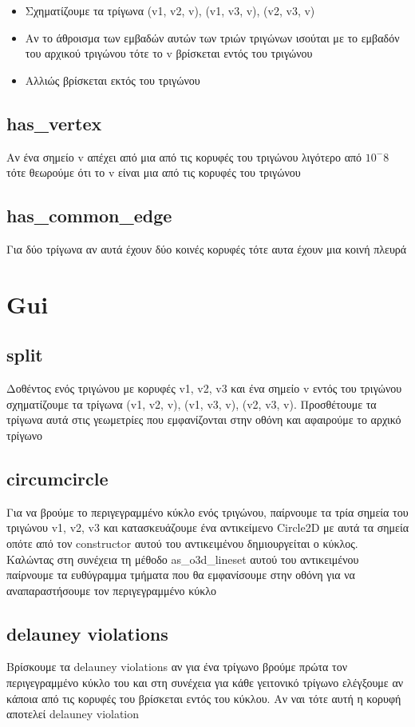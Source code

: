 \documentclass{article}
\begin{document}
\begin{itemize}
	\item Σχηματίζουμε τα τρίγωνα (v1, v2, v), (v1, v3, v), (v2, v3, v)
	\item Αν το άθροισμα των εμβαδών αυτών των τριών τριγώνων ισούται με το εμβαδόν του αρχικού τριγώνου τότε το v βρίσκεται εντός του τριγώνου
	\item Αλλιώς βρίσκεται εκτός του τριγώνου
\end{itemize}

\subsection{has\_vertex}
Αν ένα σημείο v απέχει από μια από τις κορυφές του τριγώνου λιγότερο από $10^-8$
τότε θεωρούμε ότι το v είναι μια από τις κορυφές του τριγώνου

\subsection{has\_common\_edge}
Για δύο τρίγωνα αν αυτά έχουν δύο κοινές κορυφές τότε αυτα έχουν μια κοινή πλευρά

\section{Gui}
\subsection{split}
Δοθέντος ενός τριγώνου με κορυφές v1, v2, v3 και ένα σημείο v εντός του τριγώνου
σχηματίζουμε τα τρίγωνα (v1, v2, v), (v1, v3, v), (v2, v3, v). Προσθέτουμε τα τρίγωνα
αυτά στις γεωμετρίες που εμφανίζονται στην οθόνη και αφαιρούμε το αρχικό τρίγωνο

\subsection{circumcircle}
Για να βρούμε το περιγεγραμμένο κύκλο ενός τριγώνου, παίρνουμε τα τρία σημεία του τριγώνου v1, v2, v3 και κατασκευάζουμε ένα αντικείμενο Circle2D με αυτά τα σημεία οπότε από
τον constructor αυτού του αντικειμένου δημιουργείται ο κύκλος. Καλώντας στη συνέχεια τη
μέθοδο as\_o3d\_lineset αυτού του αντικειμένου παίρνουμε τα ευθύγραμμα τμήματα που θα
εμφανίσουμε στην οθόνη για να αναπαραστήσουμε τον περιγεγραμμένο κύκλο

\subsection{delauney violations}
Βρίσκουμε τα delauney violations αν για ένα τρίγωνο βρούμε πρώτα τον περιγεγραμμένο
κύκλο του και στη συνέχεια για κάθε γειτονικό τρίγωνο ελέγξουμε αν κάποια από τις κορυφές
του βρίσκεται εντός του κύκλου. Αν ναι τότε αυτή η κορυφή αποτελεί delauney violation
\end{document}
